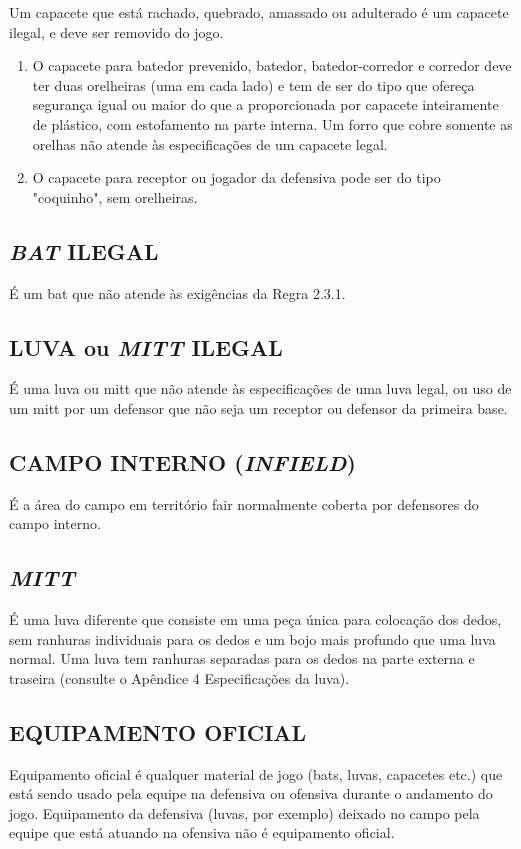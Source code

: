  Um capacete que está rachado, quebrado, amassado ou adulterado é um capacete ilegal, e deve ser removido do jogo.

\begin{enumerate}[label=(\alph*)]
	\item O capacete para batedor prevenido, batedor, batedor-corredor e corredor deve ter duas orelheiras (uma em cada lado) e tem de ser do tipo que ofereça  segurança igual ou maior do que a proporcionada por capacete inteiramente de plástico, com estofamento na parte interna. Um forro que cobre somente as orelhas não atende às especificações de um capacete legal.
 	\item O capacete para receptor ou jogador da defensiva pode ser do tipo "coquinho", sem orelheiras.
\end{enumerate}

\subsection{\textit{BAT} ILEGAL}
 É um \gls{bat} que não atende às exigências da Regra 2.3.1.

\subsection{LUVA ou \textit{MITT} ILEGAL}

 É uma luva ou \gls{mitt} que não atende às especificações de uma luva legal, ou uso de um \gls{mitt} por um defensor que não seja um receptor ou defensor da  primeira base.

\subsection{CAMPO INTERNO (\textit{INFIELD})}

 É a área do campo em território \gls{fair} normalmente coberta por defensores do campo interno.

\subsection{\textit{MITT}}
 É uma luva diferente que consiste em uma peça única para colocação dos dedos, sem ranhuras individuais para os dedos e um bojo mais profundo que uma luva  normal. Uma luva tem ranhuras separadas para os dedos na parte externa e traseira (consulte o Apêndice 4 Especificações da luva).


\subsection{EQUIPAMENTO OFICIAL}
 Equipamento oficial é qualquer material de jogo (\glspl{bat}, luvas, capacetes etc.) que está sendo usado pela equipe na defensiva ou ofensiva durante o andamento do jogo. Equipamento da defensiva (luvas, por exemplo) deixado no campo pela equipe que está atuando na ofensiva não é equipamento oficial.

